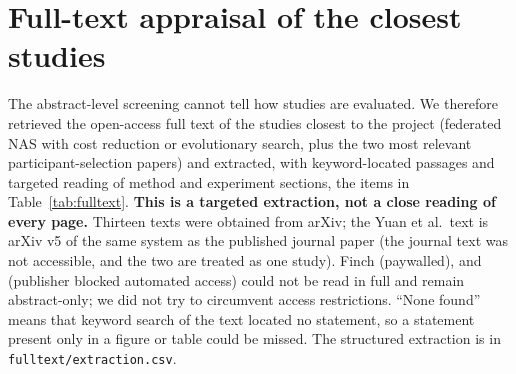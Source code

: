 \documentclass[11pt,a4paper]{article}
\begin{document}
\section{Full-text appraisal of the closest studies}\label{sec:fulltext}
The abstract-level screening cannot tell how studies are evaluated. We therefore retrieved the open-access full text of the studies closest to the project (federated NAS with cost reduction or evolutionary search, plus the two most relevant participant-selection papers) and extracted, with keyword-located passages and targeted reading of method and experiment sections, the items in Table~\ref{tab:fulltext}. \textbf{This is a targeted extraction, not a close reading of every page.} Thirteen texts were obtained from arXiv; the Yuan et al.\ text is arXiv v5 of the same system as the published journal paper \cite{yuan2022resourceaware} (the journal text was not accessible, and the two are treated as one study). Finch \cite{liu2023finch} (paywalled), and \cite{li2026multiobjective,zhong2022optimizing} (publisher blocked automated access) could not be read in full and remain abstract-only; we did not try to circumvent access restrictions. ``None found'' means that keyword search of the text located no statement, so a statement present only in a figure or table could be missed. The structured extraction is in \texttt{fulltext/extraction.csv}.
\end{document}
